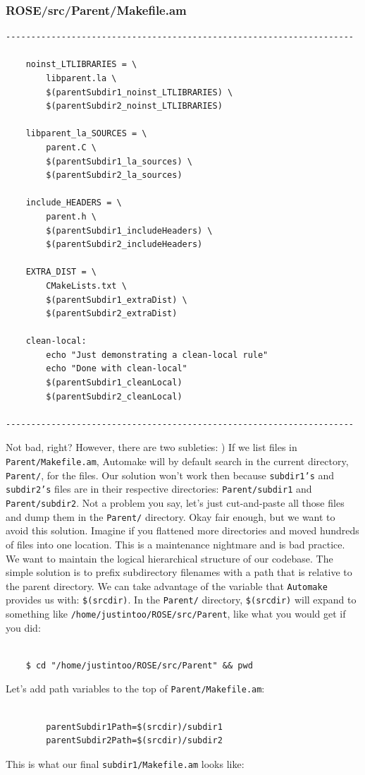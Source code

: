 \subsubsection{ROSE/src/Parent/Makefile.am}
    \begin{verbatim}
---------------------------------------------------------------------

    noinst_LTLIBRARIES = \
        libparent.la \
        $(parentSubdir1_noinst_LTLIBRARIES) \
        $(parentSubdir2_noinst_LTLIBRARIES)

    libparent_la_SOURCES = \
        parent.C \
        $(parentSubdir1_la_sources) \ 
        $(parentSubdir2_la_sources)

    include_HEADERS = \
        parent.h \
        $(parentSubdir1_includeHeaders) \ 
        $(parentSubdir2_includeHeaders) 

    EXTRA_DIST = \
        CMakeLists.txt \
        $(parentSubdir1_extraDist) \
        $(parentSubdir2_extraDist)

    clean-local:
        echo "Just demonstrating a clean-local rule"
        echo "Done with clean-local"
        $(parentSubdir1_cleanLocal)
        $(parentSubdir2_cleanLocal)

---------------------------------------------------------------------
    \end{verbatim}
Not bad, right? However, there are two subleties:
\newline\newline
1) If we list files in \texttt{Parent/Makefile.am},
Automake will by default search in the current directory, \texttt{Parent/}, for the files.
Our solution won't work then because \texttt{subdir1's} and \texttt{subdir2's} files are in
their respective directories: \texttt{Parent/subdir1} and \texttt{Parent/subdir2}. Not a
problem you say, let's just cut-and-paste all those files and dump them in the \texttt{Parent/}
directory. Okay fair enough, but we want to avoid this solution. Imagine if you
flattened more directories and moved hundreds of files into one location. This is a maintenance
nightmare and is bad practice. We want to maintain the logical hierarchical structure of our
codebase.
\newline\newline
The simple solution is to prefix subdirectory filenames with a path that is relative to
the parent directory. We can take advantage of the variable that \texttt{Automake} provides us
with: \texttt{\$(srcdir)}. In the \texttt{Parent/} directory, \texttt{\$(srcdir)} will expand
to something like \texttt{/home/justintoo/ROSE/src/Parent}, like what you would get if you did:
    \begin{verbatim}

    $ cd "/home/justintoo/ROSE/src/Parent" && pwd 
    \end{verbatim}
Let's add path variables to the top of \texttt{Parent/Makefile.am}: 
    \begin{verbatim}

        parentSubdir1Path=$(srcdir)/subdir1
        parentSubdir2Path=$(srcdir)/subdir2
    \end{verbatim}
This is what our final \texttt{subdir1/Makefile.am} looks like:
